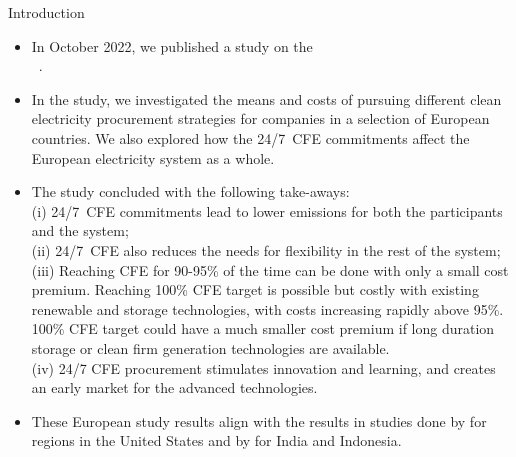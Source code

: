 \begin{frame}{Introduction}

  {\footnotesize
  \begin{itemize}
  \item In October 2022, we published a study on the  \\
  \faGithub~. 
  
  \item In the study, we investigated the \alert{means and costs} of pursuing different clean electricity procurement strategies for companies in a selection of European countries. We also explored how the 24/7~CFE commitments \alert{affect the European electricity system} as a whole. 
  
  \item The study concluded with the following take-aways: \\ 
  (i) 24/7~CFE commitments lead to lower emissions for both the
  participants and the system;\\ 
  (ii) 24/7~CFE also reduces the needs for flexibility in the rest of the system; \\ 
  (iii) Reaching CFE for 90-95\% of the time can be done with only a small cost premium. Reaching 100\% CFE target is possible but costly with existing renewable and storage technologies, with costs increasing rapidly above 95\%. 100\% CFE target could have a much smaller cost premium if long duration storage or clean firm generation technologies are available. \\ 
  (iv) 24/7 CFE procurement stimulates innovation and learning, and creates an early market for the advanced technologies.

  \item  These European study results align with the results in studies done by  for regions in the United States and by  for India and Indonesia.

  \end{itemize}
  }

\end{frame}
  


